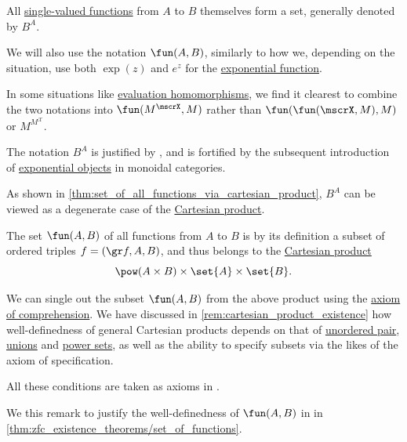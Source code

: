 \begin{definition}\label{def:set_of_all_functions}
  All \hyperref[def:function]{single-valued functions} from \( A \) to \( B \) themselves form a set, generally denoted by \( B^A \).

  We will also use the notation \( \fun(A, B) \), similarly to how we, depending on the situation, use both \( \exp(z) \) and \( e^z \) for the \hyperref[def:exponential_function]{exponential function}.
\end{definition}
\begin{comments}
  \item In some situations like \hyperref[con:free_construction/evaluation]{evaluation homomorphisms}, we find it clearest to combine the two notations into \( \fun(M^\mscrX, M) \) rather than \( \fun(\fun(\mscrX, M), M) \) or \( M^{M^\mscrX} \).

  \item The notation \( B^A \) is justified by , and is fortified by the subsequent introduction of \hyperref[def:cartesian_closed_category]{exponential objects} in monoidal categories.

  \item As shown in \cref{thm:set_of_all_functions_via_cartesian_product}, \( B^A \) can be viewed as a degenerate case of the \hyperref[def:cartesian_product]{Cartesian product}.
\end{comments}

\begin{remark}\label{rem:set_of_all_functions_existence}
  The set \hyperref[def:set_of_all_functions]{\( \fun(A, B) \)} of all functions from \( A \) to \( B \) is by its definition a subset of ordered triples \( f = (\gr f, A, B) \), and thus belongs to the \hyperref[def:cartesian_product]{Cartesian product}
  \begin{equation*}
    \pow(A \times B) \times \set{ A } \times \set{ B }.
  \end{equation*}

  We can single out the subset \( \fun(A, B) \) from the above product using the \hyperref[def:zfc/comprehension]{axiom of comprehension}. We have discussed in \cref{rem:cartesian_product_existence} how well-definedness of general Cartesian products depends on that of \hyperref[def:unordered_pair]{unordered pair}, \hyperref[def:set_union]{unions} and \hyperref[def:power_set]{power sets}, as well as the ability to specify subsets via the likes of the axiom of specification.

  All these conditions are taken as axioms in \hyperref[def:zfc]{}.
\end{remark}
\begin{comments}
  \item We this remark to justify the well-definedness of \( \fun(A, B) \) in  in \cref{thm:zfc_existence_theorems/set_of_functions}.
\end{comments}


